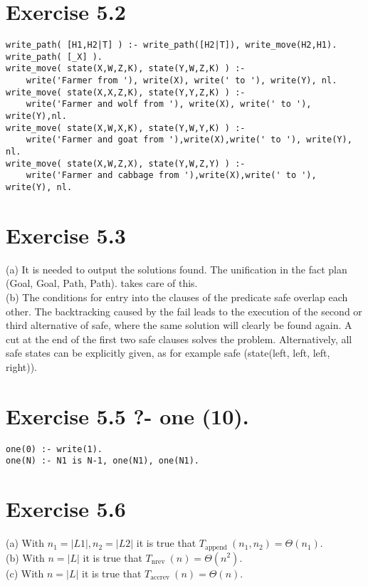 \documentclass[10pt]{article}
\begin{document}
\section*{Exercise 5.2}
\begin{verbatim}
write_path( [H1,H2|T] ) :- write_path([H2|T]), write_move(H2,H1).
write_path( [_X] ).
write_move( state(X,W,Z,K), state(Y,W,Z,K) ) :-
    write('Farmer from '), write(X), write(' to '), write(Y), nl.
write_move( state(X,X,Z,K), state(Y,Y,Z,K) ) :-
    write('Farmer and wolf from '), write(X), write(' to '), write(Y),nl.
write_move( state(X,W,X,K), state(Y,W,Y,K) ) :-
    write('Farmer and goat from '),write(X),write(' to '), write(Y), nl.
write_move( state(X,W,Z,X), state(Y,W,Z,Y) ) :-
    write('Farmer and cabbage from '),write(X),write(' to '), write(Y), nl.
\end{verbatim}

\section*{Exercise 5.3}
(a) It is needed to output the solutions found. The unification in the fact plan (Goal, Goal, Path, Path). takes care of this.\\
(b) The conditions for entry into the clauses of the predicate safe overlap each other. The backtracking caused by the fail leads to the execution of the second or third alternative of safe, where the same solution will clearly be found again. A cut at the end of the first two safe clauses solves the problem. Alternatively, all safe states can be explicitly given, as for example safe (state(left, left, left, right)).

\section*{Exercise 5.5 ?- one (10).}
\begin{verbatim}
one(0) :- write(1).
one(N) :- N1 is N-1, one(N1), one(N1).
\end{verbatim}

\section*{Exercise 5.6}
(a) With $n_{1}=|L 1|, n_{2}=|L 2|$ it is true that $T_{\text {append }}\left(n_{1}, n_{2}\right)=\Theta\left(n_{1}\right)$.\\
(b) With $n=|L|$ it is true that $T_{\text {nrev }}(n)=\Theta\left(n^{2}\right)$.\\
(c) With $n=|L|$ it is true that $T_{\text {accrev }}(n)=\Theta(n)$.
\end{document}
